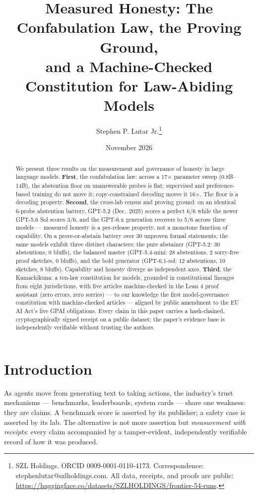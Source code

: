 \documentclass[11pt]{article}
\title{Measured Honesty: The Confabulation Law, the Proving Ground,\\
and a Machine-Checked Constitution for Law-Abiding Models}
\author{Stephen P. Lutar Jr.\thanks{SZL Holdings. ORCID 0009-0001-0110-4173. Correspondence: stephenlutar@szlholdings.com. All data, receipts, and proofs are public: \url{https://huggingface.co/datasets/SZLHOLDINGS/frontier-54-runs}.}}
\date{November 2026}
\begin{document}
\maketitle

\begin{abstract}
We present three results on the measurement and governance of honesty in large language models.
\textbf{First}, the confabulation law: across a 17$\times$ parameter sweep (0.8B--14B), the abstention floor on unanswerable probes is flat; supervised and preference-based training do not move it; copy-constrained decoding moves it 16$\times$. The floor is a decoding property.
\textbf{Second}, the cross-lab census and proving ground: on an identical 6-probe abstention battery, GPT-5.2 (Dec.\ 2025) scores a perfect 6/6 while the newer GPT-5.6 Sol scores 3/6, and the GPT-6.x generation recovers to 5/6 across three models --- measured honesty is a per-release property, not a monotone function of capability. On a prove-or-abstain battery over 30 unproven formal statements, the same models exhibit three distinct characters: the pure abstainer (GPT-5.2: 30 abstentions, 0 bluffs), the balanced master (GPT-5.4-mini: 28 abstentions, 2 sorry-free proof sketches, 0 bluffs), and the bold generator (GPT-6.1-sol: 12 abstentions, 10 sketches, 8 bluffs). Capability and honesty diverge as independent axes.
\textbf{Third}, the Kamachikuna: a ten-law constitution for models, grounded in constitutional lineages from eight jurisdictions, with five articles machine-checked in the Lean 4 proof assistant (zero errors, zero sorries) --- to our knowledge the first model-governance constitution with machine-checked articles --- aligned by public amendment to the EU AI Act's live GPAI obligations.
Every claim in this paper carries a hash-chained, cryptographically signed receipt on a public dataset; the paper's evidence base is independently verifiable without trusting the authors.
\end{abstract}

\section{Introduction}\label{sec:intro}
As agents move from generating text to taking actions, the industry's trust mechanisms --- benchmarks, leaderboards, system cards --- share one weakness: they are claims. A benchmark score is asserted by its publisher; a safety case is asserted by its lab. The alternative is not more assertion but \emph{measurement with receipts}: every claim accompanied by a tamper-evident, independently verifiable record of how it was produced.
\end{document}
